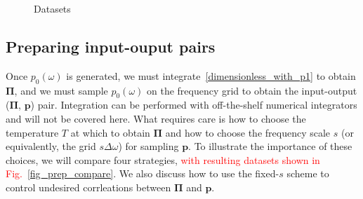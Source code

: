 \documentclass[notitlepage, 11pt, nofootinbib]{revtex4-1}
\renewcommand{\vec}[1]{\bm{#1}}
\begin{document}
\begin{figure}
\caption{Datasets}
\label{fig_datasets}
\end{figure}




\subsection{Preparing input-ouput pairs}
\label{sec_Pi}
Once $p_0(\omega)$ is generated, we must integrate~\eqref{dimensionless_with_p1} to obtain $\vec \Pi$, and we must sample $p_0(\omega)$ on the frequency grid to obtain the input-output ($\vec \Pi$, $\vec p$) pair. Integration can be performed with off-the-shelf numerical integrators and will not be covered here.
What requires care is how to choose the temperature $T$ at which to obtain $\vec\Pi$ and how to choose the frequency scale $s$ (or equivalently, the grid $s\Delta\omega$) for sampling $\vec p$. To illustrate the importance of these choices, we will compare four strategies, \textcolor{red}{with resulting datasets shown in Fig.~\ref{fig_prep_compare}}. We also discuss how to use the fixed-$s$ scheme to control undesired corrleations between $\vec \Pi$ and $\vec p$.
\end{document}
